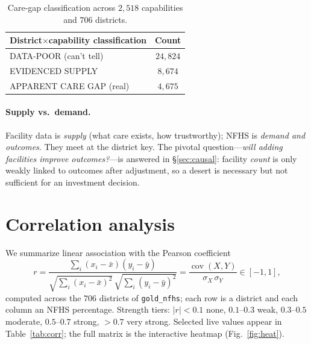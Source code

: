 \documentclass[11pt]{article}
\begin{document}
\begin{table}[H]\centering\small
\begin{tabular}{lc}
\toprule
District$\times$capability classification & Count\\
\midrule
DATA-POOR (can't tell) & $24{,}824$\\
EVIDENCED SUPPLY & $8{,}674$\\
APPARENT CARE GAP (real) & $4{,}675$\\
\bottomrule
\end{tabular}
\caption{Care-gap classification across $2{,}518$ capabilities and $706$ districts.}
\label{tab:gaps}
\end{table}

\paragraph{Supply vs.\ demand.} Facility data is \emph{supply} (what care exists, how trustworthy); NFHS is \emph{demand and outcomes}. They meet at the district key. The pivotal question---\emph{will adding facilities improve outcomes?}---is answered in \S\ref{sec:causal}: facility \emph{count} is only weakly linked to outcomes after adjustment, so a desert is necessary but not sufficient for an investment decision.

\section{Correlation analysis}\label{sec:corr}
We summarize linear association with the Pearson coefficient
\[
r=\frac{\sum_i (x_i-\bar x)(y_i-\bar y)}{\sqrt{\sum_i (x_i-\bar x)^2}\,\sqrt{\sum_i (y_i-\bar y)^2}}=\frac{\operatorname{cov}(X,Y)}{\sigma_X\,\sigma_Y}\in[-1,1],
\]
computed across the $706$ districts of \texttt{gold\_nfhs}; each row is a district and each column an NFHS percentage. Strength tiers: $|r|<0.1$ none, $0.1\text{--}0.3$ weak, $0.3\text{--}0.5$ moderate, $0.5\text{--}0.7$ strong, $>0.7$ very strong. Selected live values appear in Table~\ref{tab:corr}; the full matrix is the interactive heatmap (Fig.~\ref{fig:heat}).
\end{document}
